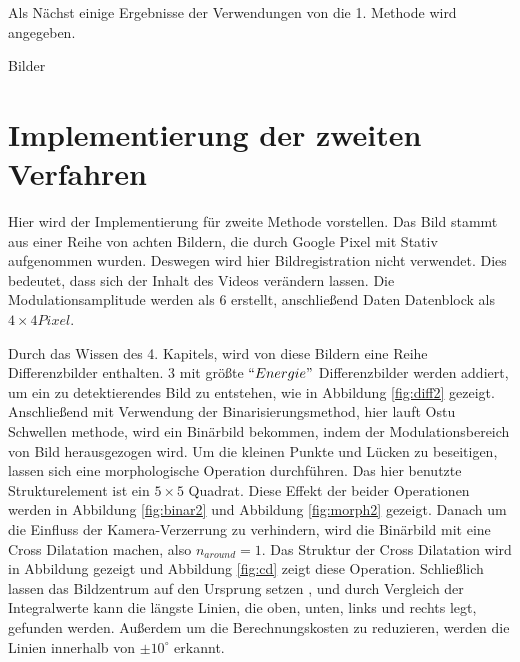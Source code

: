 Als Nächst einige Ergebnisse der Verwendungen von die 1. Methode wird angegeben.

Bilder


\section{Implementierung der zweiten Verfahren}

Hier wird der Implementierung für zweite Methode vorstellen. Das Bild stammt aus einer Reihe von achten Bildern, die durch Google Pixel mit Stativ aufgenommen wurden. Deswegen wird hier Bildregistration nicht verwendet. Dies bedeutet, dass sich der Inhalt des Videos verändern lassen. Die Modulationsamplitude werden als 6 erstellt, anschließend Daten Datenblock als $ 4 \times 4 Pixel$. 

Durch das Wissen des 4. Kapitels, wird von diese Bildern eine Reihe Differenzbilder enthalten. 3 mit größte $``Energie"$ Differenzbilder werden addiert, um ein zu detektierendes Bild zu entstehen, wie in Abbildung \ref{fig:diff2} gezeigt. Anschließend mit Verwendung der Binarisierungsmethod, hier lauft Ostu Schwellen methode, wird ein Binärbild bekommen, indem der Modulationsbereich von Bild herausgezogen wird. Um die kleinen Punkte und Lücken zu beseitigen, lassen sich eine morphologische Operation durchführen. Das hier benutzte Strukturelement ist ein $5 \times 5$ Quadrat. 
Diese Effekt der beider Operationen werden in Abbildung \ref{fig:binar2} und Abbildung \ref{fig:morph2} gezeigt. Danach um die Einfluss der Kamera-Verzerrung zu verhindern, wird die Binärbild mit eine Cross Dilatation machen, also $ n_{around} = 1$. Das Struktur der Cross Dilatation wird in Abbildung gezeigt und Abbildung \ref{fig:cd} zeigt diese Operation. Schließlich lassen das Bildzentrum auf den Ursprung setzen , und durch Vergleich der Integralwerte kann die längste Linien, die oben, unten, links und rechts legt, gefunden werden. Außerdem um die Berechnungskosten zu reduzieren, werden die Linien innerhalb von $ \pm 10^{\circ} $ erkannt. 




